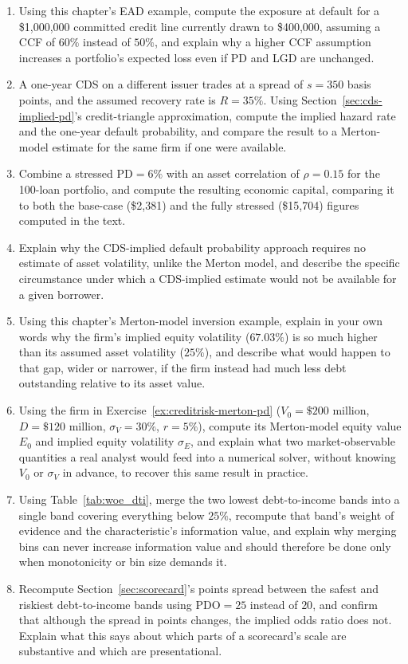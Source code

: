 \documentclass[../ai_in_finance]{subfiles}
\begin{document}
\begin{enumerate}[exercises]
    \item Using this chapter's EAD example, compute the exposure at default for a \$1,000,000 committed credit line currently drawn to \$400,000, assuming a CCF of $60\%$ instead of $50\%$, and explain why a higher CCF assumption increases a portfolio's expected loss even if PD and LGD are unchanged.
    \item A one-year CDS on a different issuer trades at a spread of $s=350$ basis points, and the assumed recovery rate is $R=35\%$. Using Section~\ref{sec:cds-implied-pd}'s credit-triangle approximation, compute the implied hazard rate and the one-year default probability, and compare the result to a Merton-model estimate for the same firm if one were available.
    \item Combine a stressed $\text{PD}=6\%$ with an asset correlation of $\rho=0.15$ for the 100-loan portfolio, and compute the resulting economic capital, comparing it to both the base-case (\$2,381) and the fully stressed (\$15,704) figures computed in the text.
    \item Explain why the CDS-implied default probability approach requires no estimate of asset volatility, unlike the Merton model, and describe the specific circumstance under which a CDS-implied estimate would not be available for a given borrower.
    \item Using this chapter's Merton-model inversion example, explain in your own words why the firm's implied equity volatility ($67.03\%$) is so much higher than its assumed asset volatility ($25\%$), and describe what would happen to that gap, wider or narrower, if the firm instead had much less debt outstanding relative to its asset value.
    \item Using the firm in Exercise~\ref{ex:creditrisk-merton-pd} ($V_0=\$200$ million, $D=\$120$ million, $\sigma_V=30\%$, $r=5\%$), compute its Merton-model equity value $E_0$ and implied equity volatility $\sigma_E$, and explain what two market-observable quantities a real analyst would feed into a numerical solver, without knowing $V_0$ or $\sigma_V$ in advance, to recover this same result in practice.
    \item Using Table~\ref{tab:woe_dti}, merge the two lowest debt-to-income bands into a single band covering everything below $25\%$, recompute that band's weight of evidence and the characteristic's information value, and explain why merging bins can never increase information value and should therefore be done only when monotonicity or bin size demands it.
    \item Recompute Section~\ref{sec:scorecard}'s points spread between the safest and riskiest debt-to-income bands using $\text{PDO}=25$ instead of $20$, and confirm that although the spread in points changes, the implied odds ratio does not. Explain what this says about which parts of a scorecard's scale are substantive and which are presentational.

\end{enumerate}
\end{document}
